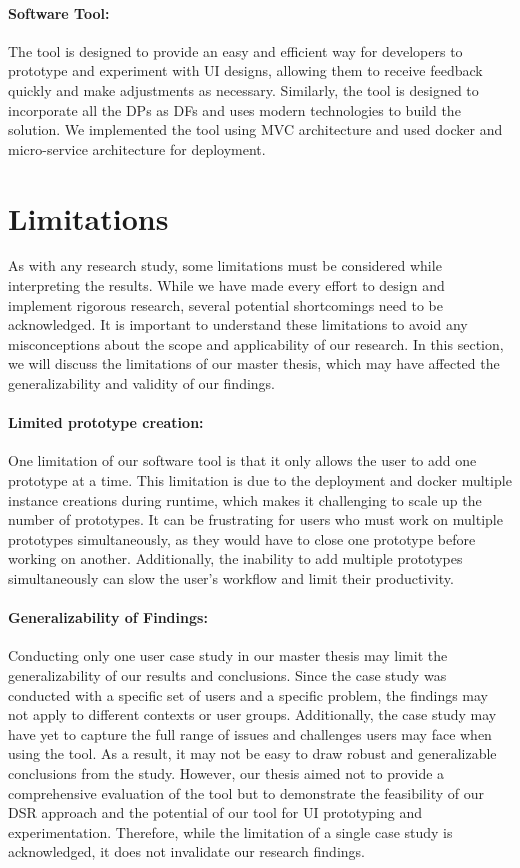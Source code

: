 \paragraph{Software Tool:}
The tool is designed to provide an easy and efficient way for developers to prototype and experiment with UI designs, allowing them to receive feedback quickly and make adjustments as necessary. 
Similarly, the tool is designed to incorporate all the DPs as DFs and uses modern technologies to build the solution. 
We implemented the tool using MVC architecture and used docker and micro-service architecture for deployment.
\clearpage

\section{Limitations}
\label{section:conclusion:limitations}
As with any research study, some limitations must be considered while interpreting the results. 
While we have made every effort to design and implement rigorous research, several potential shortcomings need to be acknowledged.
It is important to understand these limitations to avoid any misconceptions about the scope and applicability of our research. 
In this section, we will discuss the limitations of our master thesis, which may have affected the generalizability and validity of our findings.

\paragraph{Limited prototype creation:}
One limitation of our software tool is that it only allows the user to add one prototype at a time. 
This limitation is due to the deployment and docker multiple instance creations during runtime, which makes it challenging to scale up the number of prototypes. 
It can be frustrating for users who must work on multiple prototypes simultaneously, as they would have to close one prototype before working on another. 
Additionally, the inability to add multiple prototypes simultaneously can slow the user's workflow and limit their productivity.

\paragraph{Generalizability of Findings:}
Conducting only one user case study in our master thesis may limit the generalizability of our results and conclusions. 
Since the case study was conducted with a specific set of users and a specific problem, the findings may not apply to different contexts or user groups. 
Additionally, the case study may have yet to capture the full range of issues and challenges users may face when using the tool. 
As a result, it may not be easy to draw robust and generalizable conclusions from the study.
However, our thesis aimed not to provide a comprehensive evaluation of the tool but to demonstrate the feasibility of our DSR approach and the potential of our tool for UI prototyping and experimentation. 
Therefore, while the limitation of a single case study is acknowledged, it does not invalidate our research findings.

